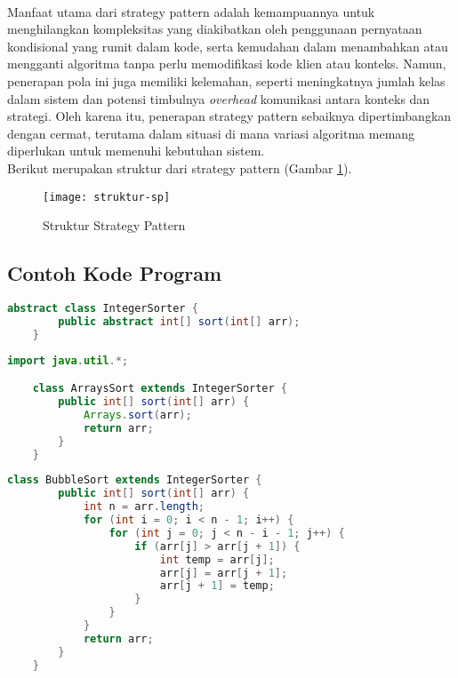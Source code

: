 \\
Manfaat utama dari strategy pattern adalah kemampuannya untuk menghilangkan kompleksitas yang diakibatkan oleh penggunaan pernyataan kondisional yang rumit dalam kode, serta kemudahan dalam menambahkan atau mengganti algoritma tanpa perlu memodifikasi kode klien atau konteks. Namun, penerapan pola ini juga memiliki kelemahan, seperti meningkatnya jumlah kelas dalam sistem dan potensi timbulnya \textit{overhead} komunikasi antara konteks dan strategi. Oleh karena itu, penerapan strategy pattern sebaiknya dipertimbangkan dengan cermat, terutama dalam situasi di mana variasi algoritma memang diperlukan untuk memenuhi kebutuhan sistem.
\\
Berikut merupakan struktur dari strategy pattern (Gambar \ref{fig:struktursp}).
\begin{figure}[h] 
	\centering  
	\texttt{[image: struktur-sp]}  
	\caption{Struktur Strategy Pattern}
	\label{fig:struktursp} 
\end{figure}
\newpage
\subsection{Contoh Kode Program}
\label{sec:kode}
\begin{lstlisting}[language=Java, caption=IntegerSorter.java, basicstyle=\small\ttfamily]
    abstract class IntegerSorter {
        public abstract int[] sort(int[] arr);
    }
\end{lstlisting}

\begin{lstlisting}[language=Java, caption=ArraysSort.java, basicstyle=\small\ttfamily]
    import java.util.*;

    class ArraysSort extends IntegerSorter {
        public int[] sort(int[] arr) {
            Arrays.sort(arr);
            return arr;
        }
    }
\end{lstlisting}

\begin{lstlisting}[language=Java, caption=BubbleSort.java, basicstyle=\small\ttfamily]
    class BubbleSort extends IntegerSorter {
        public int[] sort(int[] arr) {
            int n = arr.length;
            for (int i = 0; i < n - 1; i++) {
                for (int j = 0; j < n - i - 1; j++) {
                    if (arr[j] > arr[j + 1]) {
                        int temp = arr[j];
                        arr[j] = arr[j + 1];
                        arr[j + 1] = temp;
                    }
                }
            }
            return arr;
        }
    }
\end{lstlisting}

